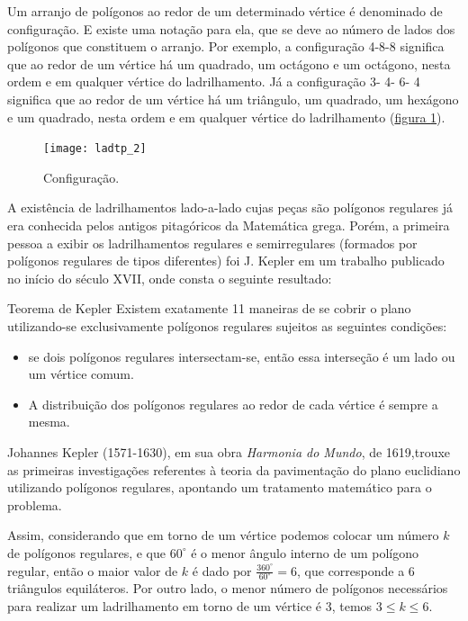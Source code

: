 Um arranjo de polígonos ao redor de um determinado vértice é denominado de configuração. E existe uma notação para ela, que se deve ao número de lados dos polígonos que constituem o arranjo. Por exemplo, a configuração 4-8-8 significa que ao redor de um vértice há um quadrado, um octágono e um octágono, nesta ordem e em qualquer vértice do ladrilhamento. Já a configuração 3- 4- 6- 4 significa que ao redor de um vértice há um triângulo, um quadrado, um hexágono e um quadrado, nesta ordem e em qualquer vértice do ladrilhamento (\hyperref[lad_tp2]{figura \ref{lad_tp2}}).


\begin{figure}[H]
\centering
\texttt{[image: ladtp\_2]}
\caption{Configuração.}
\label{lad_tp2}
\end{figure}

A existência de ladrilhamentos lado-a-lado cujas peças são polígonos regulares já era conhecida pelos antigos pitagóricos da Matemática grega. Porém, a primeira pessoa a exibir os ladrilhamentos regulares e semirregulares (formados por polígonos regulares de tipos diferentes) foi J. Kepler em um trabalho publicado no início do século XVII, onde consta o seguinte resultado:

\begin{observation}{Teorema de Kepler}
Existem exatamente 11 maneiras de se cobrir o plano utilizando-se exclusivamente polígonos regulares sujeitos as seguintes condições:
\begin{itemize}
\item	se dois polígonos regulares intersectam-se, então essa interseção é um lado ou um vértice comum.
\item	A distribuição dos polígonos regulares ao redor de cada vértice é sempre a mesma.
\end{itemize}

\end{observation}



\begin{knowledge}
Johannes Kepler (1571-1630), em sua obra \textit{Harmonia do Mundo}, de 1619,trouxe as primeiras investigações referentes à teoria da pavimentação do plano euclidiano utilizando polígonos regulares, apontando um tratamento matemático para o problema.
\end{knowledge}




Assim, considerando que em torno de um vértice podemos colocar um número $k$ de polígonos regulares, e que $60^{\circ}$ é o menor ângulo interno de um polígono regular, então o maior valor de $k$ é dado por $\displaystyle \frac{360^{\circ}}{60^{\circ}} = 6$, que corresponde a 6 triângulos equiláteros. Por outro lado, o menor número de polígonos necessários para realizar um ladrilhamento em torno de um vértice é 3, temos  $3\leq k \leq 6$.

